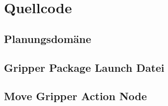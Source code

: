 \newpage
{} %
\listoftables
\newpage

\setlength{\parskip}{0.5em} 




\clearpage
{}  
    \setcounter{page}{1}
\lhead{\nouppercase{\leftmark}}







%
\clearpage
\lhead{}
\printbibliography
{}


\clearpage
\appendix
\section{Quellcode} %
\subsection{Planungsdomäne}

\subsection{Gripper Package Launch Datei}

\subsection{Move Gripper Action Node}



